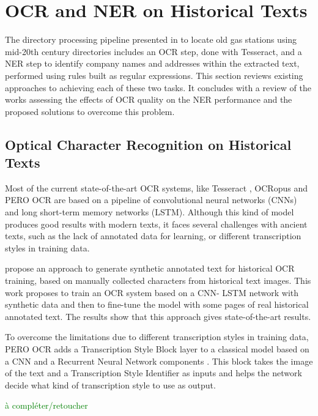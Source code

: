\section{OCR and NER on Historical Texts}

The directory processing pipeline presented in \cite{bell2020automated} to locate old gas stations using mid-20th century directories includes an OCR step, done with Tesseract, and a NER step to identify company names and addresses within the extracted text, performed using rules built as regular expressions. This section reviews existing approaches to achieving each of these two tasks. It concludes with a review of the works assessing the effects of OCR quality on the NER performance and the proposed solutions to overcome this problem. 

\subsection{Optical Character Recognition on Historical Texts}

Most of the current state-of-the-art OCR systems, like Tesseract \cite{smith2007overview}, OCRopus \cite{breuel2008ocropus} and PERO OCR \cite{kohut2021ts} are based on a pipeline of convolutional neural networks (CNNs) and long short-term memory networks (LSTM). Although this kind of model produces good results with modern texts, it faces several challenges with ancient texts, such as the lack of annotated data for learning, or different transcription styles in training data.

\cite{martinek2019hybrid} propose an approach to generate synthetic annotated text for historical OCR training, based on manually collected characters from historical text images. This work proposes to train an OCR system based on a CNN-
LSTM network with synthetic data and then to fine-tune the model with some pages of real historical annotated text. The results show that this approach gives state-of-the-art results. 

To overcome the limitations due to different transcription styles in training data, PERO OCR adds a Transcription Style Block layer to a classical model based on a CNN and a Recurrent Neural Network components \cite{kohut2021ts}. This block takes the image of the text and a Transcription Style Identifier as inputs and helps the network decide what kind of transcription style to use as output.

\textcolor{green}{à compléter/retoucher}

